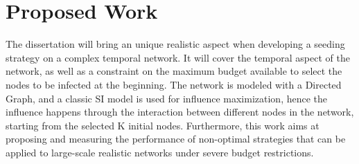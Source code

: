 \section{Proposed Work}
\label{sec:proposed}
The dissertation will bring an unique realistic aspect when developing a seeding strategy on a complex temporal network. It will cover the temporal aspect of the network, as well as a constraint on the maximum budget available to select the nodes to be infected at the beginning. The  network is modeled with a Directed Graph, and a classic SI model is used for influence maximization, hence the influence happens through the interaction between different nodes in the network, starting from the selected K initial nodes. Furthermore, this work aims at proposing and measuring the performance of non-optimal strategies that can be applied to large-scale realistic networks under severe budget restrictions.







